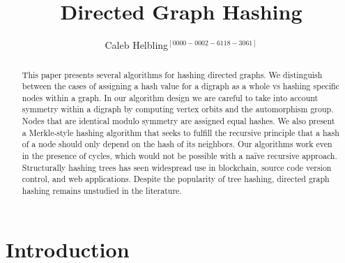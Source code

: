 \documentclass{svproc}
\def\orcidID#1{\unskip$^{[#1]}$} %
\begin{document}
\mainmatter              %
%
\title{Directed Graph Hashing}
%
%
\author{Caleb Helbling\orcidID{0000-0002-6118-3061}}
%
%


\maketitle              %

\begin{abstract}

This paper presents several algorithms for hashing directed graphs. We distinguish between the cases of assigning a hash value for a digraph as a whole vs hashing specific nodes within a graph. In our algorithm design we are careful to take into account symmetry within a digraph by computing vertex orbits and the automorphism group. Nodes that are identical modulo symmetry are assigned equal hashes. We also present a Merkle-style hashing algorithm that seeks to fulfill the recursive principle that a hash of a node should only depend on the hash of its neighbors. Our algorithms work even in the presence of cycles, which would not be possible with a na\"ive recursive approach. Structurally hashing trees has seen widespread use in blockchain, source code version control, and web applications. Despite the popularity of tree hashing, directed graph hashing remains unstudied in the literature.

\end{abstract}
%
\section{Introduction}\label{sec:introduction}
%
\end{document}
